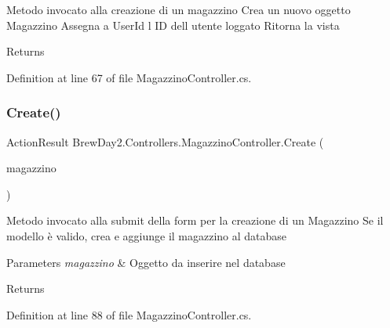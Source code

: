 Metodo invocato alla creazione di un magazzino Crea un nuovo oggetto Magazzino Assegna a User\+Id l\textquotesingle{} ID dell\textquotesingle{} utente loggato Ritorna la vista 

\begin{DoxyReturn}{Returns}

\end{DoxyReturn}


Definition at line 67 of file Magazzino\+Controller.\+cs.

\mbox{\label{class_brew_day2_1_1_controllers_1_1_magazzino_controller_a486782c46e67cd8f68b402afb4e80814}} 
\subsubsection{\texorpdfstring{Create()}{Create()}\hspace{0.1cm}{\footnotesize\ttfamily [2/2]}}
{\footnotesize\ttfamily Action\+Result Brew\+Day2.\+Controllers.\+Magazzino\+Controller.\+Create (\begin{DoxyParamCaption}\item[{\mbox{[}\+Bind(\+Include = \char`\"{}\+Magazzino\+Id,\+User\+Id\char`\"{})\mbox{]} \mbox{\hyperlink{class_brew_day2_1_1_models_1_1_magazzino}{Magazzino}}}]{magazzino }\end{DoxyParamCaption})}



Metodo invocato alla submit della form per la creazione di un Magazzino Se il modello è valido, crea e aggiunge il magazzino al database 


\begin{DoxyParams}{Parameters}
{\em magazzino} & Oggetto da inserire nel database\\
\hline
\end{DoxyParams}
\begin{DoxyReturn}{Returns}

\end{DoxyReturn}


Definition at line 88 of file Magazzino\+Controller.\+cs.

\mbox{\label{class_brew_day2_1_1_controllers_1_1_magazzino_controller_a81997006a07ff282ba98b7cc31dfac9a}} 
